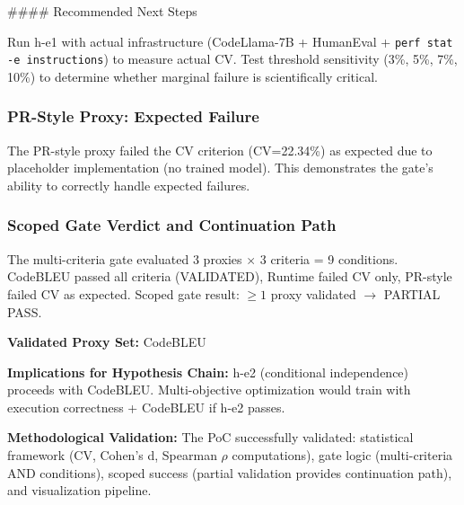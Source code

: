 \#\#\#\# Recommended Next Steps

Run h-e1 with actual infrastructure (CodeLlama-7B + HumanEval + \texttt{perf stat -e instructions}) to measure actual CV. Test threshold sensitivity (3\%, 5\%, 7\%, 10\%) to determine whether marginal failure is scientifically critical.

\subsubsection{PR-Style Proxy: Expected Failure}

The PR-style proxy failed the CV criterion (CV=22.34\%) as expected due to placeholder implementation (no trained model). This demonstrates the gate's ability to correctly handle expected failures.

\subsubsection{Scoped Gate Verdict and Continuation Path}

The multi-criteria gate evaluated 3 proxies $\times$ 3 criteria = 9 conditions. CodeBLEU passed all criteria (VALIDATED), Runtime failed CV only, PR-style failed CV as expected. Scoped gate result: $\geq 1$ proxy validated $\rightarrow$ PARTIAL PASS.

\textbf{Validated Proxy Set:} {CodeBLEU}

\textbf{Implications for Hypothesis Chain:} h-e2 (conditional independence) proceeds with CodeBLEU. Multi-objective optimization would train with execution correctness + CodeBLEU if h-e2 passes.

\textbf{Methodological Validation:} The PoC successfully validated: statistical framework (CV, Cohen's d, Spearman $\rho$ computations), gate logic (multi-criteria AND conditions), scoped success (partial validation provides continuation path), and visualization pipeline.
